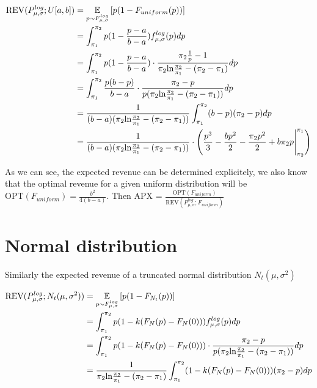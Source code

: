 \begin{equation}\notag
\begin{split}	
	\text{REV}(P^{log}_{\mu,\sigma} ;U[a,b]) &=\underset{p \sim F^{log}_{\mu,\sigma} }{\mathbb{E}}\left[ p(1-F_{uniform}(p))\right] \\ &= \int_{\pi_1}^{\pi_2} p(1 -  \frac{p-a}{b-a})f^{log}_{\mu,\sigma}(p)dp\\ &=\int_{\pi_1}^{\pi_2} p(1 -  \frac{p-a}{b-a}) \cdot \frac{\pi_2\frac{1}{p} -1}{\pi_2 \text{ln}\frac{\pi_2}{\pi_1} - (\pi_2-\pi_1)} dp \\&=\int_{\pi_1}^{\pi_2} \frac{p(b-p)}{b-a} \cdot \frac{\pi_2 -p}{p(\pi_2 \text{ln}\frac{\pi_2}{\pi_1} - (\pi_2-\pi_1))} dp \\&=  \frac{1}{(b-a)(\pi_2 \text{ln}\frac{\pi_2}{\pi_1} - (\pi_2-\pi_1))}\int_{\pi_1}^{\pi_2} (b-p)(\pi_2-p)dp\\&=  \frac{1}{(b-a)(\pi_2 \text{ln}\frac{\pi_2}{\pi_1} - (\pi_2-\pi_1))} \cdot \left( \frac{p^3}{3} -\frac{bp^2}{2} -\frac{\pi_2p^2}{2} + b\pi_2 p \Biggr|_{\pi_2}^{\pi_1} \right)              
\end{split}
\end{equation} 

As we can see, the expected revenue can be determined explicitely, we also know that the optimal revenue for a given uniform distribution will be $\text{OPT}(F_{uniform}) = \frac{b^{2}}{4(b-a)}$. Then APX = $\frac{\text{OPT}(F_{uniform})}{\text{REV}(P^{log}_{\mu,\sigma} ;F_{uniform}) }$ 

\section{Normal distribution}
Similarly the expected revenue of a truncated normal distribution $N_t(\mu, \sigma^2)$

\begin{equation}\notag
\begin{split}	
	\text{REV}(P^{log}_{\mu,\sigma} ;N_t(\mu, \sigma^2)) &=\underset{p \sim F^{log}_{\mu,\sigma} }{\mathbb{E}}\left[ p(1-F_{N_t}(p))\right] \\ &= \int_{\pi_1}^{\pi_2} p(1 -  k(F_{N}(p)-F_{N}(0)))f^{log}_{\mu,\sigma}(p)dp \\&=\int_{\pi_1}^{\pi_2} p(1 -  k(F_{N}(p)-F_{N}(0)))\cdot \frac{\pi_2 -p}{p(\pi_2 \text{ln}\frac{\pi_2}{\pi_1} - (\pi_2-\pi_1))} dp \\&=  \frac{1}{\pi_2 \text{ln}\frac{\pi_2}{\pi_1} - (\pi_2-\pi_1)}\int_{\pi_1}^{\pi_2} (1 -  k(F_{N}(p)-F_{N}(0)))(\pi_2-p)dp 
\end{split}
\end{equation} 


